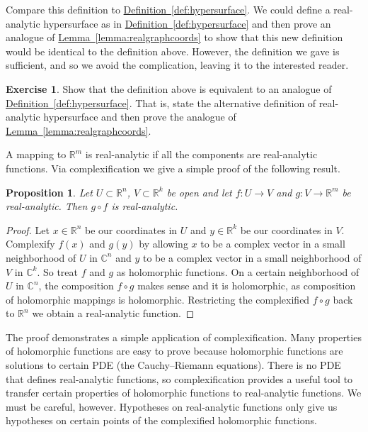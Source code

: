 \documentclass[12pt,openany]{book}
\newcommand{\C}{{\mathbb{C}}}
\newcommand{\R}{{\mathbb{R}}}
\theoremstyle{plain}
\newtheorem{prop}[thm]{Proposition}
\theoremstyle{remark}
\theoremstyle{definition}
\newenvironment{exbox}{%
    \def\FrameCommand{\vrule width 1pt \relax\hspace{10pt}}%
    \MakeFramed{\advance\hsize-\width\FrameRestore}%
}{%
    \endMakeFramed
}
\theoremstyle{exercise}
\newtheorem{exercise}{Exercise}[section]
\theoremstyle{example}
\newcommand{\lemmaref}[1]{\hyperref[#1]{Lemma~\ref*{#1}}}
\newcommand{\defnref}[1]{\hyperref[#1]{Definition~\ref*{#1}}}
\begin{document}
Compare this definition to \defnref{def:hypersurface}.  We could
define a real-analytic hypersurface as in
\defnref{def:hypersurface} and then prove an analogue of
\lemmaref{lemma:realgraphcoords} to show that this new definition
would be identical to the definition above.
However, the definition we gave is sufficient, and so we avoid
the complication, leaving it to the interested reader.

\begin{exbox}
\begin{exercise}
Show that the definition above is equivalent to an analogue of
\defnref{def:hypersurface}.  That is, state the alternative definition of
real-analytic hypersurface and then prove the analogue of
\lemmaref{lemma:realgraphcoords}.
\end{exercise}
\end{exbox}

A mapping to $\R^m$ is real-analytic if all the components are real-analytic
functions.  Via complexification we give a simple proof of the following
result.

\begin{prop}
Let $U \subset \R^n$, $V \subset \R^k$ be open and let
$f \colon U \to V$ and $g \colon V \to \R^m$ be real-analytic.
Then $g \circ f$ is real-analytic.
\end{prop}

\begin{proof}
Let $x \in \R^n$ be our coordinates in $U$ and $y \in \R^k$ be
our coordinates in $V$.  Complexify $f(x)$ and $g(y)$ by
allowing $x$ to be a complex vector in a small neighborhood of $U$ in
$\C^n$
and $y$ to be a complex vector in a small neighborhood of $V$ in $\C^k$.
So treat $f$ and $g$ as holomorphic functions.  On a certain
neighborhood of $U$ in $\C^n$, the composition $f \circ g$ makes sense
and it is holomorphic, as composition of holomorphic mappings is holomorphic.
Restricting the complexified $f \circ g$ back to $\R^n$ we obtain a
real-analytic function.
\end{proof}

The proof demonstrates a simple application of complexification.  Many
properties of holomorphic functions are easy to prove because
holomorphic functions are solutions to certain PDE (the Cauchy--Riemann
equations).  There is no PDE
that defines real-analytic functions, so complexification provides a useful
tool to transfer certain properties of holomorphic functions to
real-analytic functions.  We must be careful, however.  Hypotheses on
real-analytic functions only give us hypotheses on certain points of the
complexified holomorphic functions.
\end{document}
